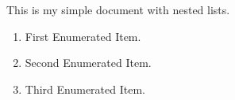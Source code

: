 \documentclass{article}
\begin{document}
This is my simple document with nested lists. 
\begin{enumerate}
\item First Enumerated Item. 
\item Second Enumerated Item. 
\item Third Enumerated Item. 
\end{enumerate}
\end{document}
